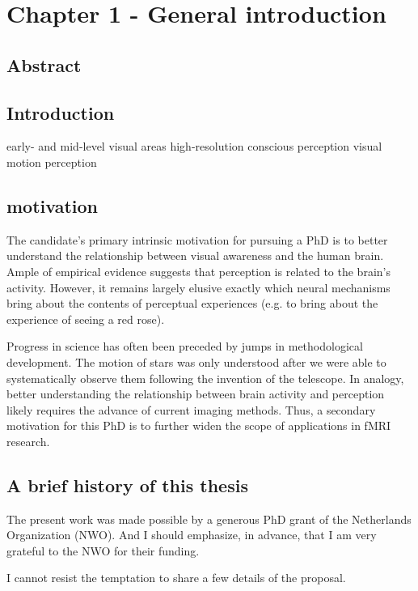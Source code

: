 \chapter{Chapter 1 - General introduction}

\section*{Abstract}
\lipsum[2-2]


\section{Introduction}

early- and mid-level visual areas
high-resolution
conscious perception
visual motion perception

\section{motivation}
The candidate’s primary intrinsic motivation for pursuing a PhD is to better understand the relationship between visual awareness and the human brain. Ample of empirical evidence suggests that perception is related to the brain’s activity. However, it remains largely elusive exactly which neural mechanisms bring about the contents of perceptual experiences (e.g. to bring about the experience of seeing a red rose).

Progress in science has often been preceded by jumps in methodological development. The motion of stars was only understood after we were able to systematically observe them following the invention of the telescope. In analogy, better understanding the relationship between brain activity and perception likely requires the advance of current imaging methods. Thus, a secondary motivation for this PhD is to further widen the scope of applications in fMRI research.

\section{A brief history of this thesis}
The present work was made possible by a generous PhD grant of the Netherlands Organization (NWO). And I should emphasize, in advance, that I am very grateful to the NWO for their funding. 

I cannot resist the temptation to share a few details of the proposal.

